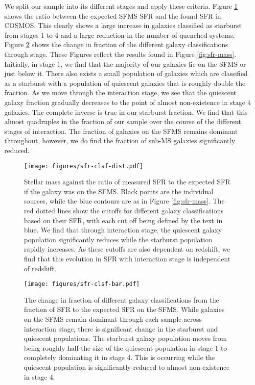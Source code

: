 \documentclass[fleqn,usenatbib]{mnras}
\begin{document}
\noindent We split our sample into its different stages and apply these criteria. Figure \ref{fig:sfr-clsf} shows the ratio between the expected SFMS SFR and the found SFR in COSMOS. This clearly shows a large increase in galaxies classified as starburst from stages 1 to 4 and a large reduction in the number of quenched systems. Figure \ref{fig:sfr-clsf-bar} shows the change in fraction of the different galaxy classifications through stage. These Figures reflect the results found in Figure \ref{fig:sfr-mass}. Initially, in stage 1, we find that the majority of our galaxies lie on the SFMS or just below it. There also exists a small population of galaxies which are classified as a starburst with a population of quiescent galaxies that is roughly double the fraction. As we move through the interaction stage, we see that the quiescent galaxy fraction gradually decreases to the point of almost non-existence in stage 4 galaxies. The complete inverse is true in our starburst fraction. We find that this almost quadruples in the fraction of our sample over the course of the different stages of interaction. The fraction of galaxies on the SFMS remains dominant throughout, however, we do find the fraction of sub-MS galaxies significantly reduced.

\begin{figure}
    \centering
    \texttt{[image: figures/sfr-clsf-dist.pdf]}
    \caption{Stellar mass against the ratio of measured SFR to the expected SFR if the galaxy was on the SFMS. Black points are the individual sources, while the blue contours are as in Figure \ref{fig:sfr-mass}. The red dotted lines show the cutoffs for different galaxy classifications based on their SFR, with each cut off being defined by the text in blue. We find that through interaction stage, the quiescent galaxy population significantly reduces while the starburst population rapidly increases. As these cutoffs are also dependent on redshift, we find that this evolution in SFR with interaction stage is independent of redshift.}
    \label{fig:sfr-clsf}
\end{figure}

\begin{figure}
    \centering
    \texttt{[image: figures/sfr-clsf-bar.pdf]}
    \caption{The change in fraction of different galaxy classifications from the fraction of SFR to the expected SFR on the SFMS. While galaxies on the SFMS remain dominant through each sample across interaction stage, there is significant change in the starburst and quiescent populations. The starburst galaxy population moves from being roughly half the size of the quiescent population in stage 1 to completely dominating it in stage 4. This is occurring while the quiescent population is significantly reduced to almost non-existence in stage 4.}
    \label{fig:sfr-clsf-bar}
\end{figure}
\end{document}
